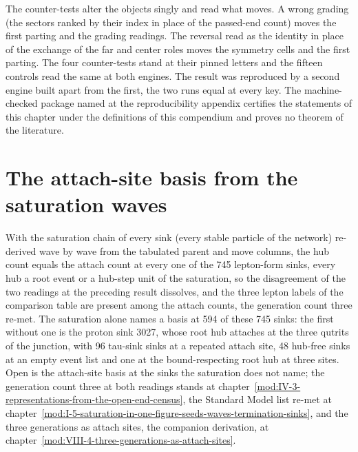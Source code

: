 \begin{chproof}
The counter-tests alter the objects singly and read what moves. A wrong grading (the sectors ranked by their index in place of the passed-end count) moves the first parting and the grading readings. The reversal read as the identity in place of the exchange of the far and center roles moves the symmetry cells and the first parting. The four counter-tests stand at their pinned letters and the fifteen controls read the same at both engines. The result was reproduced by a second engine built apart from the first, the two runs equal at every key.
The machine-checked package named at the reproducibility appendix certifies the statements of this chapter under the definitions of this compendium and proves no theorem of the literature.
\end{chproof}
\section{The attach-site basis from the saturation waves}\label{mod:II-1-D538971-w-atsx}
\begin{chwall}\label{box:II-1-D538971-w-atsx:1}
With the saturation chain of every sink (every stable particle of the network) re-derived wave by wave from the tabulated parent and move columns, the hub count equals the attach count at every one of the 745 lepton-form sinks, every hub a root event or a hub-step unit of the saturation, so the disagreement of the two readings at the preceding result dissolves, and the three lepton labels of the comparison table are present among the attach counts, the generation count three re-met. The saturation alone names a basis at 594 of these 745 sinks: the first without one is the proton sink 3027, whose root hub attaches at the three qutrits of the junction, with 96 tau-sink sinks at a repeated attach site, 48 hub-free sinks at an empty event list and one at the bound-respecting root hub at three sites.
Open is the attach-site basis at the sinks the saturation does not name; the generation count three at both readings stands at chapter~\ref{mod:IV-3-representations-from-the-open-end-census}, the Standard Model list re-met at chapter~\ref{mod:I-5-saturation-in-one-figure-seeds-waves-termination-sinks}, and the three generations as attach sites, the companion derivation, at chapter~\ref{mod:VIII-4-three-generations-as-attach-sites}.
\end{chwall}
